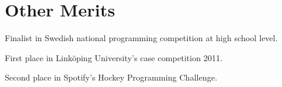 \documentclass[a4paper,10pt]{article} %
\begin{document}

\section{Other Merits}

\begin{itemize}[noitemsep,topsep=0pt,parsep=0pt,partopsep=0pt]
\small{
\item Finalist in Swedish national programming competition at high school level.
\item First place in Linköping University’s case competition 2011.
\item Second place in Spotify’s Hockey Programming Challenge.}
\end{itemize}
\end{document}
